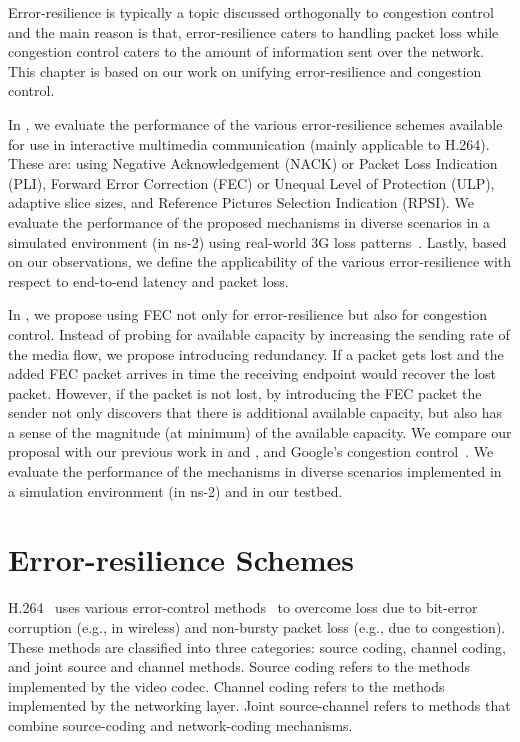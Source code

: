 Error-resilience is typically a topic discussed orthogonally to congestion
control and the main reason is that, error-resilience caters to handling
packet loss while congestion control caters to the amount of information sent
over the network. This chapter is based on our work on unifying
error-resilience and congestion control.

In , we evaluate the performance of the various
error-resilience schemes available for use in interactive multimedia
communication (mainly applicable to H.264). These are: using Negative
Acknowledgement (NACK) or Packet Loss Indication (PLI), Forward Error
Correction (FEC) or Unequal Level of Protection (ULP), adaptive slice sizes,
and Reference Pictures Selection Indication (RPSI). We evaluate the
performance of the proposed mechanisms in diverse scenarios in a simulated
environment (in ns-2) using real-world 3G loss patterns~\cite{3gppSim}.
Lastly, based on our observations, we define the applicability of the various
error-resilience with respect to end-to-end latency and packet loss.

In , we propose using FEC not only for error-resilience but
also for congestion control. Instead of probing for available capacity by
increasing the sending rate of the media flow, we propose introducing
redundancy. If a packet gets lost and the added FEC packet arrives in time the
receiving endpoint would recover the lost packet. However, if the packet is
not lost, by introducing the FEC packet the sender not only discovers that
there is additional available capacity, but also has a sense of the magnitude
(at minimum) of the available capacity. We compare our proposal with our
previous work in  and , and Google's
congestion control~\cite{draft.rrtcc}. We evaluate the performance of the
mechanisms in diverse scenarios implemented in a simulation environment (in
ns-2) and in our testbed.

\section{Error-resilience Schemes}

H.264~\cite{h264} uses various error-control methods~\cite{err_res_h264_std,
wang98error, wang00review, 310669} to overcome loss due to bit-error
corruption (e.g., in wireless) and non-bursty packet loss (e.g., due to
congestion). These methods are classified into three categories: source
coding, channel coding, and joint source and channel methods. Source coding
refers to the methods implemented by the video codec. Channel coding refers to
the methods implemented by the networking layer. Joint source-channel refers
to methods that combine source-coding and network-coding mechanisms.

